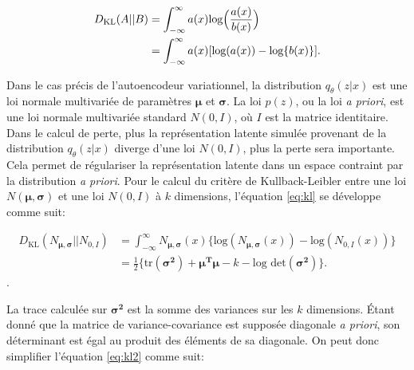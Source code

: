 \begin{equation}  \label{eq:kl}
	\DIFdelbegin %
\DIFdelend \DIFaddbegin \begin{aligned}
		D_{\text{KL}}(A || B) &= \int_{-\infty}^{\infty} a(x) \text{log} \Big(\frac{a(x)}{b(x)}\Big)  \\
		 &= \int_{-\infty}^{\infty} a(x) [\text{log}(a(x)) - \text{log}\{b(x)\}]\text{.}
	\end{aligned}\DIFaddend 
\end{equation}

Dans le cas précis de l'autoencodeur variationnel, la distribution $q_{\theta}(z|x)$ est une loi normale multivariée de paramètres $\boldsymbol \mu$ et $\boldsymbol \sigma$. La loi $p(z)$, ou la loi \textit{a priori}, est une loi normale multivariée standard $N(0,I)$, où $I$ est la matrice identitaire. Dans le calcul de perte, plus la représentation latente simulée provenant de la distribution $q_{\theta}(z|x)$ diverge d'une loi $N(0, I)$, plus la perte sera importante. Cela permet de régulariser la représentation latente dans un espace contraint par la distribution \textit{a priori}. Pour le calcul du critère de Kullback-Leibler entre une loi $N(\boldsymbol \mu, \boldsymbol \sigma)$ et une loi $N(0, I)$ à $k$ dimensions, l'équation \ref{eq:kl} se développe comme suit:

\begin{equation}  \label{eq:kl2}
	\begin{aligned}
	D_{\text{KL}}(N_{\boldsymbol \mu, \boldsymbol \sigma} || N_{0,I}) &= \int_{-\infty}^{\infty} N_{\boldsymbol \mu, \boldsymbol \sigma}(x) \big\{\text{log}(N_{\boldsymbol \mu,\boldsymbol \sigma}(x)) - \text{log}(N_{0,I}(x))\big\} \\
		&= \frac{1}{2}\big\{\text{tr}(\boldsymbol{\sigma^2}) + \boldsymbol{\mu^T} \boldsymbol{\mu} - k - \text{log det}(\boldsymbol{\sigma^2})\big \}.
 	\end{aligned}
\end{equation}.

La trace calculée sur $\boldsymbol{\sigma^2}$ est la somme des variances sur les $k$ dimensions. Étant donné que la matrice de variance-covariance est supposée diagonale \textit{a priori}, son déterminant est égal au produit des éléments de sa diagonale. On peut donc simplifier l'équation \ref{eq:kl2} comme suit:

